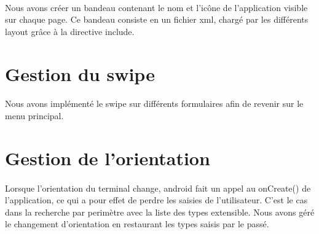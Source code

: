 \begin{center}
\end{center}

\paragraph{}
Nous avons créer un bandeau contenant le nom et l'icône de l'application visible sur chaque page. Ce bandeau consiste en un fichier xml, chargé par les différents layout grâce à la directive include.
\section*{Gestion du swipe}
\paragraph{}
Nous avons implémenté le swipe sur différents formulaires afin de revenir sur le menu principal.

\section*{Gestion de l'orientation}
\paragraph{}
Lorsque l'orientation du terminal change, android fait un appel au onCreate() de l'application, ce qui a pour effet de perdre les saisies de l'utilisateur. C'est le cas dans la recherche par perimètre avec la liste des types extensible.
Nous avons géré le changement d'orientation en restaurant les types saisis par le passé.

